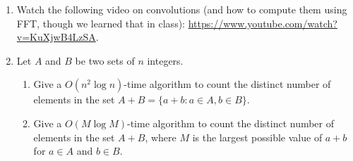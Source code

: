 \documentclass[11pt]{article}
\begin{document}
\begin{enumerate}


\item
Watch the following video on convolutions (and how to compute them using FFT,
though we learned that in class):
\url{https://www.youtube.com/watch?v=KuXjwB4LzSA}.


\item Let $A$ and $B$ be two sets of $n$ integers.  

\begin{enumerate}
	\item Give a $O(n^2 \log n)$-time algorithm to count the distinct
	number of elements in the set $A+B = \{a+b : a \in A, b \in B\}$.
	\item Give a $O(M \log M)$-time algorithm to count the distinct number of
	elements in the set $A+B$, where $M$ is the largest possible value of $a+b$
	for $a \in A$ and $b \in B$.
\end{enumerate}



\end{enumerate}
\end{document}
